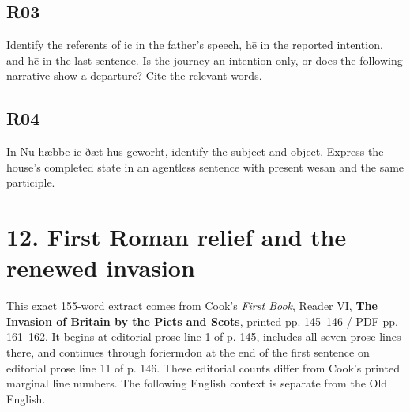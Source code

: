 \subsection*{R03}

\par\begin{minipage}{\linewidth}\raggedright
Identify the referents of ic in the father’s speech, hē in the reported intention, and hē in the last sentence. Is the journey an intention only, or does the following narrative show a departure? Cite the relevant words.

\end{minipage}\par\addvspace{4pt}

\subsection*{R04}

\par\begin{minipage}{\linewidth}\raggedright
In Nū hæbbe ic ðæt hūs geworht, identify the subject and object. Express the house’s completed state in an agentless sentence with present wesan and the same participle.

\end{minipage}\par\addvspace{4pt}

\section*{12. First Roman relief and the renewed invasion}

This exact 155-word extract comes from Cook’s \emph{First Book}, Reader VI, \textbf{The Invasion of Britain by the Picts and Scots}, printed pp. 145–146 /\allowbreak{} PDF pp. 161–162. It begins at editorial prose line 1 of p. 145, includes all seven prose lines there, and continues through foriermdon at the end of the first sentence on editorial prose line 11 of p. 146. These editorial counts differ from Cook’s printed marginal line numbers. The following English context is separate from the Old English.

